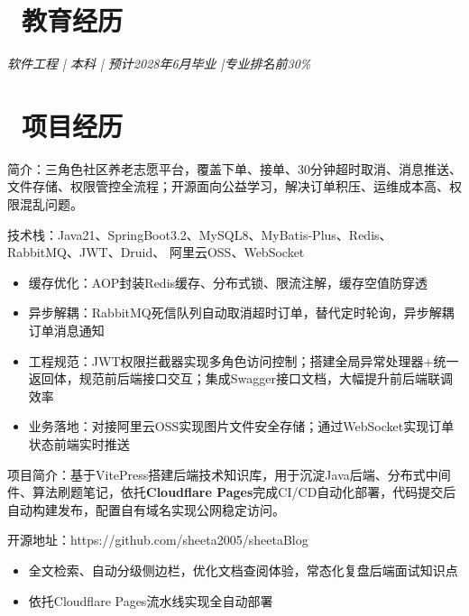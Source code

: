 \documentclass{resume}
\begin{document}



\section{\faGraduationCap\ 教育经历}
\textit{软件工程 | 本科 | 预计2028年6月毕业 |专业排名前30\%}


\section{\faUsers\ 项目经历}
简介：三角色社区养老志愿平台，覆盖下单、接单、30分钟超时取消、消息推送、文件存储、权限管控全流程；开源面向公益学习，解决订单积压、运维成本高、权限混乱问题。

技术栈：Java21、SpringBoot3.2、MySQL8、MyBatis-Plus、Redis、RabbitMQ、JWT、Druid、 阿里云OSS、WebSocket
\begin{itemize}
  \item 缓存优化：AOP封装Redis缓存、分布式锁、限流注解，缓存空值防穿透
  \item 异步解耦：RabbitMQ死信队列自动取消超时订单，替代定时轮询，异步解耦订单消息通知
  \item 工程规范：JWT权限拦截器实现多角色访问控制；搭建全局异常处理器+统一返回体，规范前后端接口交互；集成Swagger接口文档，大幅提升前后端联调效率
  \item 业务落地：对接阿里云OSS实现图片文件安全存储；通过WebSocket实现订单状态前端实时推送
\end{itemize}

项目简介：基于VitePress搭建后端技术知识库，用于沉淀Java后端、分布式中间件、算法刷题笔记，依托\textbf{Cloudflare Pages}完成CI/CD自动化部署，代码提交后自动构建发布，配置自有域名实现公网稳定访问。

开源地址：https://github.com/sheeta2005/sheetaBlog
\begin{itemize}
  \item 全文检索、自动分级侧边栏，优化文档查阅体验，常态化复盘后端面试知识点
  \item 依托Cloudflare Pages流水线实现全自动部署
\end{itemize}
\end{document}

